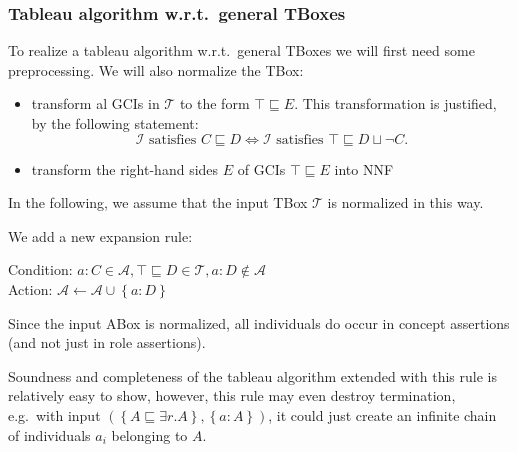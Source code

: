 \subsubsection{Tableau algorithm w.r.t.\ general TBoxes}
To realize a tableau algorithm w.r.t.\ general TBoxes we will first need some preprocessing.
We will also normalize the TBox:
\begin{itemize}
	\item transform al GCIs in $\mathcal{T}$ to the form $\top \sqsubseteq E$.
		This transformation is justified, by the following statement:
		\[
		\mathcal{I} \text{ satisfies } C \sqsubseteq D \iff \mathcal{I} \text{ satisfies } \top \sqsubseteq D \sqcup \neg C
		.\]
	\item transform the right-hand sides $E$ of GCIs $\top \sqsubseteq E$ into NNF
\end{itemize}
In the following, we assume that the input TBox $\mathcal{T}$ is normalized in this way.

We add a new expansion rule:
\begin{mdframed}[frametitle= The $\sqsubseteq$-rule, nobreak = true]
	Condition: $a : C \in \mathcal{A}, \top \sqsubseteq D \in \mathcal{T}, a : D \notin \mathcal{A}$ \\
	Action: $\mathcal{A} \leftarrow \mathcal{A} \cup \left\{ a: D \right\}$
\end{mdframed}
\begin{note}
	Since the input ABox is normalized, all individuals do occur in concept assertions (and not just in role assertions).
\end{note}

Soundness and completeness of the tableau algorithm extended with this rule is relatively easy to show,
however, this rule may even destroy termination,
e.g.\ with input $(\left\{ A \sqsubseteq \exists r.A \right\}, \left\{ a :A \right\})$, it could just create an infinite chain of individuals $a_i$ belonging to  $A$.
